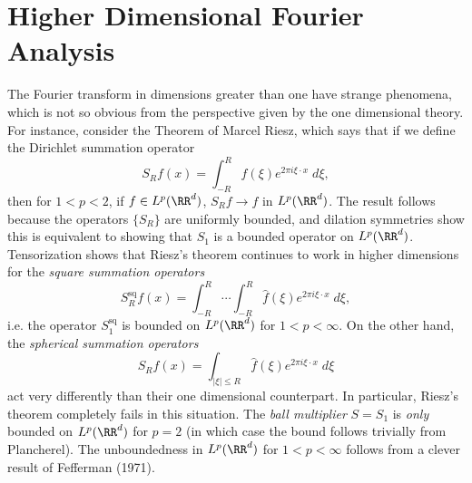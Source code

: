 \chapter{Higher Dimensional Fourier Analysis}

The Fourier transform in dimensions greater than one have strange phenomena, which is not so obvious from the perspective given by the one dimensional theory. For instance, consider the Theorem of Marcel Riesz, which says that if we define the Dirichlet summation operator
%
\[ S_R f(x) = \int_{-R}^R \widehat{f}(\xi) e^{2 \pi i \xi \cdot x}\; d\xi, \]
%
then for $1 < p < 2$, if $f \in L^p(\RR^d)$, $S_R f \to f$ in $L^p(\RR^d)$. The result follows because the operators $\{ S_R \}$ are uniformly bounded, and dilation symmetries show this is equivalent to showing that $S_1$ is a bounded operator on $L^p(\RR^d)$. Tensorization shows that Riesz's theorem continues to work in higher dimensions for the \emph{square summation operators}
%
\[ S_R^{\text{sq}} f(x) = \int_{-R}^R \cdots \int_{-R}^R \widehat{f}(\xi) e^{2 \pi i \xi \cdot x}\; d\xi, \]
%
i.e. the operator $S_1^{\text{sq}}$ is bounded on $L^p(\RR^d)$ for $1 < p < \infty$. On the other hand, the \emph{spherical summation operators}
%
\[ S_R f(x) = \int_{|\xi| \leq R} \widehat{f}(\xi) e^{2 \pi i \xi \cdot x}\; d\xi \]
%
act very differently than their one dimensional counterpart. In particular, Riesz's theorem completely fails in this situation. The \emph{ball multiplier} $S = S_1$ is \emph{only} bounded on $L^p(\RR^d)$ for $p = 2$ (in which case the bound follows trivially from Plancherel). The unboundedness in $L^p(\RR^d)$ for $1 < p < \infty$ follows from a clever result of Fefferman (1971).

